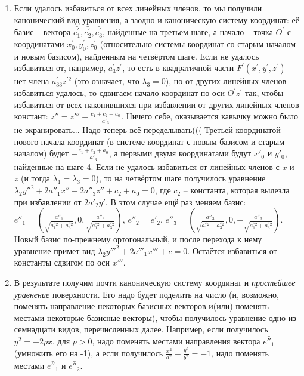 \documentclass[a4paper, 12pt]{article}
\theoremstyle{definition}
\begin{document}
\begin{enumerate}
    \item Если удалось избавиться от всех линейных членов, то мы получили канонический вид уравнения, а заодно и каноническую систему координат: её базис – вектора $\bar{e_1^{'}}, \bar{e_2^{'}}, \bar{e_3^{'}}$, найденные на третьем шаге, а начало – точка $O^{'}$ с координатами $x_0^{'}, y_0^{'}, z_0^{'}$ (относительно системы координат со старым началом и новым базисом), найденным на четвёртом шаге.
    Если не удалось избавиться от, например, $a_3^{'} z^{'}$, то есть в квадратичной части $F^{'}(x^{'},y^{'},z^{'})$ нет члена $a_33^{'} z^{'2}$ (это означает, что $\lambda_3 = 0$), но от других линейных членов избавиться удалось, то сдвигаем начало координат по оси $O^{'} z^{'}$ так, чтобы избавиться от всех накопившихся при избавлении от других линейных членов констант:
    $z'' = z''' - \frac{c_1 + c_2 + a_0}{a'_3}$. Ничего себе, оказывается кавычку можно было не экранировать... Надо теперь всё переделывать(((
    Третьей координатой нового начала координат (в системе координат с новым базисом и старым началом) будет $- \frac{c_1 + c_2 + a_0}{a'_3}$, а первыми двумя координатами будут $x'_0$ и $y'_0$, найденные на шаге 4. Если не удалось избавиться от линейных членов с $x$ и $z$ (и тогда $\lambda_1 = \lambda_3 = 0$), то на четвёртом шаге получилось уравнение $\lambda_2 y''^2 + 2a''_1 x'' + 2a''_3 z'' + c_2 + a_0 = 0$, где $c_2$ – константа, которая вылезла при избавлении от $2a'_2 y'$.
    В этом случае ещё раз меняем базис:
    $\bar{e''_1} = \left( \frac{a''_1}{\sqrt{a_1^{''2} + a_3^{''2}}}, 0, \frac{a''_3}{\sqrt{a_1^{''2} + a_3^{''2}}} \right)$,
    $\bar{e''_2} = \bar{e'_2}$,
    $\bar{e''_3} = \left( \frac{a''_3}{\sqrt{a_1^{''2} + a_3^{''2}}}, 0, -\frac{a''_3}{\sqrt{a_1^{''2} + a_3^{''2}}} \right)$.
    Новый базис по-прежнему ортогональный, и после перехода к нему уравнение примет вид $\lambda_2 y'''^2 + 2a'''_1 x''' + c = 0$.
    Остаётся избавиться от константы сдвигом по оси $x'''$.
    \item В результате получим почти каноническую систему координат и \textit{простейшее уравнение} поверхности. Его надо будет поделить на число (и, возможно, поменять направление некоторых базисных векторов и(или) поменять местами некоторые базисные векторы), чтобы получилось уравнение одно из семнадцати видов, перечисленных далее.
    Например, если получилось $y^2 = -2px$, для $p > 0$, надо поменять местами направления вектора $\bar{e''_1}$ (умножить его на -1), а если получилось
    $\frac{x^2}{a^2} - \frac{y^2}{b^2} = -1$, надо поменять местами $\bar{e''_1}$ и $\bar{e''_2}$.
\end{enumerate}
\end{document}
